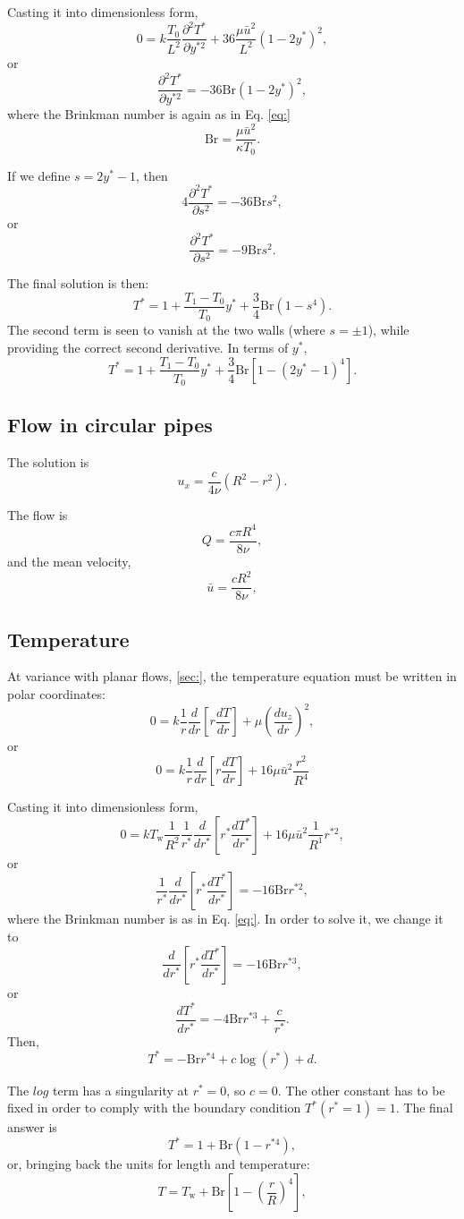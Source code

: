 Casting it into dimensionless form,
\[
0 =  k \frac{T_0}{ L^2} \frac{\partial^2 T^*}{\partial y^{*2}} +
36 \frac{\mu \bar{u}^2}{L^2}  \left( 1- 2 y^*  \right)^2 ,
\]
or
\[
 \frac{\partial^2 T^*}{\partial y^{*2}} = 
  - 36 \mathrm{Br} \left( 1- 2 y^*  \right)^2 ,
\]
where the  Brinkman number is again as in Eq. \ref{eq:}
\[
\mathrm{Br} =
\frac{ \mu \bar{u}^2 }{ \kappa T_0 } .
\]

If we define $s = 2  y^* - 1$, then
\[
 4 \frac{\partial^2 T^*}{\partial s^{2}} = 
 - 36 \mathrm{Br} s^2,
 \]
 or
\[
 \frac{\partial^2 T^*}{\partial s^{2}} = 
 - 9 \mathrm{Br} s^2.
\]


The final solution is then:
\[
T^* = 1 + \frac{T_1-T_0}{T_0} y^* +
\frac34 \mathrm{Br}  \left( 1 - s^{4} \right) .
\]
The second term is seen to vanish at the two walls (where $s=\pm 1$),
while providing the correct second derivative. In terms of $y^*$,
\[
T^* = 1 + \frac{T_1-T_0}{T_0} y^* +
\frac34 \mathrm{Br}  \left[ 1 -  \left( 2  y^* - 1 \right)^{4} \right] .
\]




\subsection{Flow in circular pipes}

The solution is
\[
u_x=\frac{c}{4\nu} \left( R^2 - r^2 \right) .
\]


The flow is
\[
Q= \frac{c \pi R^4}{8\nu} ,
\]
and the mean velocity,
\[
\bar{u}= \frac{c R^2}{8\nu} ,
\]



\subsection{Temperature}


At variance with planar flows, \ref{sec:}, the temperature equation
must be written in polar coordinates:
\[
0 =
k
\frac{1}{r} \frac{d}{dr} \left[
  r \frac{dT}{dr} \right] +
\mu  \left( \frac{d u_z}{d r} \right)^2,
\]
or
\[
0 = k
\frac{1}{r} \frac{d}{dr}
\left[
  r \frac{dT}{dr}
\right] +
16 \mu  \bar{u}^2 \frac{r^2}{R^4}
\]

Casting it into dimensionless form,
\[
0 = k T_\mathrm{w}
\frac{1}{R^2}
\frac{1}{r^*} \frac{d}{dr^*}
\left[
  r^* \frac{dT^*}{dr^*}
\right] +
16 \mu  \bar{u}^2 \frac{1}{R^1} r^{*2},
\]
or
\[
\frac{1}{r^*} \frac{d}{dr^*}
\left[
  r^* \frac{dT^*}{dr^*}
\right] =
- 16 \mathrm{Br}  r^{*2},
\]
where the  Brinkman number is as in Eq. \ref{eq:}.
In order to solve it, we change it to
\[
 \frac{d}{dr^*}
\left[
  r^* \frac{dT^*}{dr^*}
\right] =
 - 16 \mathrm{Br}  r^{*3},
\]
or
\[
 \frac{dT^*}{dr^*} =
 - 4 \mathrm{Br}  r^{*3} + \frac{c}{r^*} .
 \]
 Then,
\[
T^* = - \mathrm{Br}  r^{*4} + c \log( r^* ) + d .
 \]

 The $log$ term has a singularity at $r^*=0$, so $c=0$. The other
 constant has to be fixed in order to comply with the boundary
 condition $T^*(r^*=1)=1$. The final answer is
\[
T^* =  1 + \mathrm{Br} \left( 1 - r^{*4} \right) ,
\]
or, bringing back the units for length and temperature:
\[
T =  T_\mathrm{w}  + \mathrm{Br} \left[ 1 - \left(\frac{r}{R}\right)^4 \right] ,
\]

